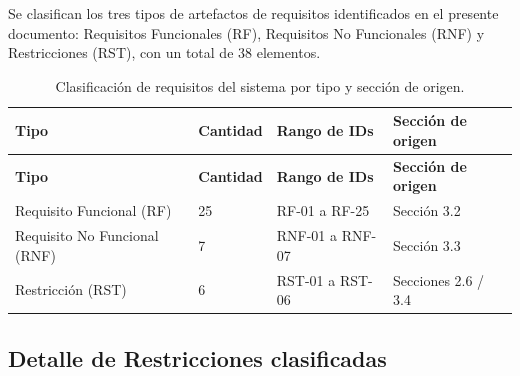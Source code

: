 \documentclass[11pt,a4paper]{article}
\begin{document}
Se clasifican los tres tipos de artefactos de requisitos identificados en el presente documento: Requisitos Funcionales (RF), Requisitos No Funcionales (RNF) y Restricciones (RST), con un total de 38 elementos.

\begin{longtable}{|p{5cm}|p{2.5cm}|p{3.4cm}|p{4.5cm}|}
\caption{Clasificación de requisitos del sistema por tipo y sección de origen.}
\label{tab:clasificacion-requisitos} \\
\hline

\textbf{Tipo} & \textbf{Cantidad} & \textbf{Rango de IDs} & \textbf{Sección de origen} \\
\hline

\endfirsthead

\hline
\textbf{Tipo} & \textbf{Cantidad} & \textbf{Rango de IDs} & \textbf{Sección de origen} \\
\hline
\endhead

\hline
\endfoot

\hline
\endlastfoot

Requisito Funcional (RF) & 25 & RF-01 a RF-25 & Sección 3.2 \\
\hline

Requisito No Funcional (RNF) & 7 & RNF-01 a RNF-07 & Sección 3.3 \\
\hline

Restricción (RST) & 6 & RST-01 a RST-06 & Secciones 2.6 / 3.4 \\
\hline

\end{longtable}

\subsection{Detalle de Restricciones clasificadas}
\end{document}
